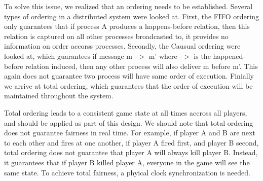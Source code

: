 To solve this issue, we realized that an ordering needs to be established. Several types of ordering in a distributed system were looked at. First, the FIFO ordering only guarantees that if process A produces a happens-before relation, then this relation is captured on all other processes broadcasted to, it provides no information on order accorss processes. Secondly, the Causual ordering were looked at, which guarantees if message m -$>$ m' where -$>$ is the happened-before relation induced, then any other process will also deliver m before m'. This again does not guarantee two process will have same order of execution. Finially we arrive at total ordering, which guarantees that the order of execution will be maintained throughout the system.

Total ordering leads to a consistent game state at all times accross all players, and should be applied as part of this design. We should note that total ordering does not guarantee fairness in real time. For example, if player A and B are next to each other and fires at one another, if player A fired first, and player B second, total ordering does not guarantee that player A will always kill player B. Instead, it guarantees that if player B killed player A, everyone in the game will see the same state. To achieve total fairness, a phyical clock synchronization is needed.
